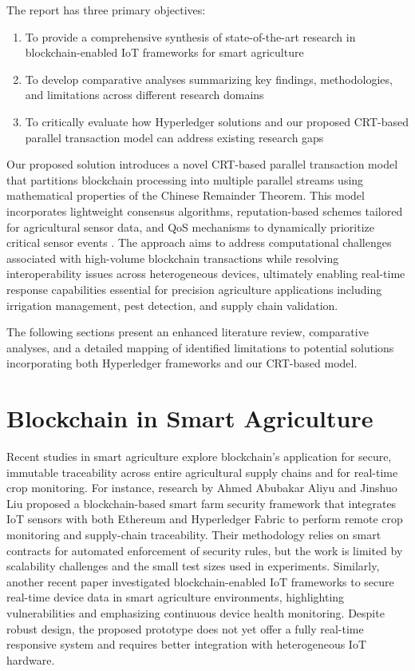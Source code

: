 \documentclass[12pt,onecolumn]{IEEEtran} %
\begin{document}
The report has three primary objectives:
\begin{enumerate}
    \item To provide a comprehensive synthesis of state-of-the-art research in blockchain-enabled IoT frameworks for smart agriculture
    \item To develop comparative analyses summarizing key findings, methodologies, and limitations across different research domains
    \item To critically evaluate how Hyperledger solutions and our proposed CRT-based parallel transaction model can address existing research gaps
\end{enumerate}

Our proposed solution introduces a novel CRT-based parallel transaction model that partitions blockchain processing into multiple parallel streams using mathematical properties of the Chinese Remainder Theorem. This model incorporates lightweight consensus algorithms, reputation-based schemes tailored for agricultural sensor data, and QoS mechanisms to dynamically prioritize critical sensor events \cite{thiruvenkatasamy2025anonlinetool, huang2025digitaltraceabilityin}. The approach aims to address computational challenges associated with high-volume blockchain transactions while resolving interoperability issues across heterogeneous devices, ultimately enabling real-time response capabilities essential for precision agriculture applications including irrigation management, pest detection, and supply chain validation.

The following sections present an enhanced literature review, comparative analyses, and a detailed mapping of identified limitations to potential solutions incorporating both Hyperledger frameworks and our CRT-based model.


\section{Blockchain in Smart Agriculture}
Recent studies in smart agriculture explore blockchain's application for secure, immutable traceability across entire agricultural supply chains and for real-time crop monitoring. For instance, research by Ahmed Abubakar Aliyu and Jinshuo Liu \cite{aliyu2023blockchainbasedsmartfarm} proposed a blockchain-based smart farm security framework that integrates IoT sensors with both Ethereum and Hyperledger Fabric to perform remote crop monitoring and supply-chain traceability. Their methodology relies on smart contracts for automated enforcement of security rules, but the work is limited by scalability challenges and the small test sizes used in experiments. Similarly, another recent paper \cite{aliyu2023blockchainbasedsmartfarm} investigated blockchain-enabled IoT frameworks to secure real-time device data in smart agriculture environments, highlighting vulnerabilities and emphasizing continuous device health monitoring. Despite robust design, the proposed prototype does not yet offer a fully real-time responsive system and requires better integration with heterogeneous IoT hardware.
\end{document}
